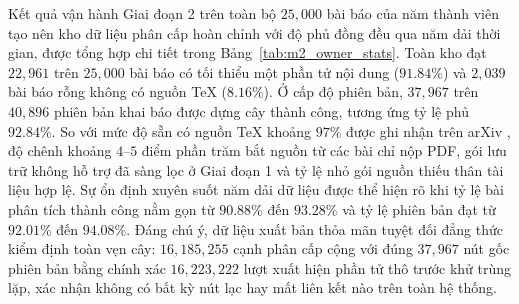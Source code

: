 Kết quả vận hành Giai đoạn 2 trên toàn bộ $25{,}000$ bài báo của năm thành viên tạo nên kho dữ liệu phân cấp hoàn chỉnh với độ phủ đồng đều qua năm dải thời gian, được tổng hợp chi tiết trong Bảng~\ref{tab:m2_owner_stats}. Toàn kho đạt $22{,}961$ trên $25{,}000$ bài báo có tối thiểu một phần tử nội dung ($91.84\%$) và $2{,}039$ bài báo rỗng không có nguồn TeX ($8.16\%$). Ở cấp độ phiên bản, $37{,}967$ trên $40{,}896$ phiên bản khai báo được dựng cây thành công, tương ứng tỷ lệ phủ $92.84\%$. So với mức độ sẵn có nguồn TeX khoảng $97\%$ được ghi nhận trên arXiv \cite{ginev2024}, độ chênh khoảng $4$--$5$ điểm phần trăm bắt nguồn từ các bài chỉ nộp PDF, gói lưu trữ không hỗ trợ đã sàng lọc ở Giai đoạn 1 và tỷ lệ nhỏ gói nguồn thiếu thân tài liệu hợp lệ. Sự ổn định xuyên suốt năm dải dữ liệu được thể hiện rõ khi tỷ lệ bài phân tích thành công nằm gọn từ $90.88\%$ đến $93.28\%$ và tỷ lệ phiên bản đạt từ $92.01\%$ đến $94.08\%$. Đáng chú ý, dữ liệu xuất bản thỏa mãn tuyệt đối đẳng thức kiểm định toàn vẹn cây: $16{,}185{,}255$ cạnh phân cấp cộng với đúng $37{,}967$ nút gốc phiên bản bằng chính xác $16{,}223{,}222$ lượt xuất hiện phần tử thô trước khử trùng lặp, xác nhận không có bất kỳ nút lạc hay mất liên kết nào trên toàn hệ thống.

